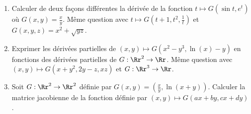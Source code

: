 \documentclass[12pt, class=report,crop=false]{standalone}
\begin{document}
\begin{miniexercices}
\sauteligne
\begin{enumerate}
  \item Calculer de deux façons différentes la dérivée de la fonction
  $t \mapsto G(\sin t, e^t)$ où $G(x,y)=\frac xy$. 
  Même question avec $t \mapsto G(t+1,t^2,\frac1t)$ et $G(x,y,z) = x^2+\sqrt{yz}$.
  
  \item Exprimer les dérivées partielles de $(x,y) \mapsto G(x^2-y^3,\ln(x)-y)$ en fonctions des dérivées partielles de $G : \Rr^2 \to \Rr$. Même question avec $(x,y) \mapsto G(x+y^2,2y-z,xz)$
  et $G : \Rr^3 \to \Rr$.
  
  \item Soit $G : \Rr^2 \to \Rr^2$ définie par $G(x,y) = \left( \frac{x}{y}, \ln(x+y) \right)$.
  Calculer la matrice jacobienne de la fonction définie par $(x,y) \mapsto G(ax+by,cx+dy)$.
\end{enumerate}
\end{miniexercices}



 


\finchapitre 
\end{document}
